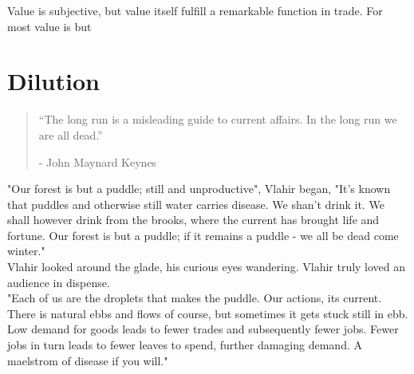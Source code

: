 \documentclass[smalldemyvopaper,11pt,twoside,onecolumn,openright,extrafontsizes]{memoir}
\newlength\drop
\begin{document}

Value is subjective, but value itself fulfill a remarkable function in trade. For most value is but 

\chapter{Dilution}

\vspace{-1.3cm}
\begin{localsize}{10}
	\begin{quote}
		“The long run is a misleading guide to current affairs. In the long run we are all dead.” 
		\begin{flushright}- John Maynard Keynes \end{flushright}
	\end{quote} 
\end{localsize}
\vspace{1cm}

"Our forest is but a puddle; still and unproductive", Vlahir began, "It's known that puddles and otherwise still water carries disease. We shan't drink it.
We shall however drink from the brooks, where the current has brought life and fortune. Our forest is but a puddle; if it remains a puddle - we all be dead come winter."\\

Vlahir looked around the glade, his curious eyes wandering. Vlahir truly loved an audience in dispense.\\

"Each of us are the droplets that makes the puddle. Our actions, its current. There is natural ebbs and flows of course, but sometimes it gets stuck still in ebb. Low demand for goods leads to fewer trades and subsequently fewer jobs. Fewer jobs in turn leads to fewer leaves to spend, further damaging demand. A maelstrom of disease if you will."\\
\end{document}
